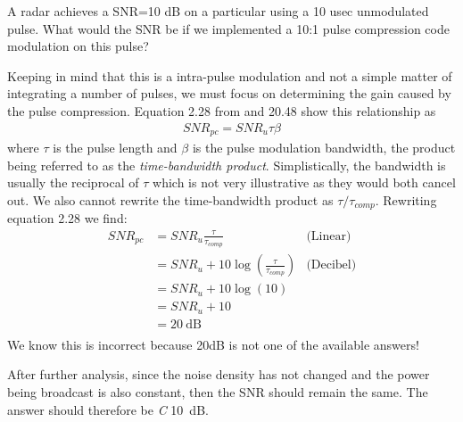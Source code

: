 \documentclass[12pt]{article}
\newcommand\SNR{\mathit{SNR}} %
\newenvironment{exercise}[2][Exercise]{\begin{trivlist}
    \item[\hskip \labelsep {\bfseries #1}\hskip \labelsep {\bfseries #2.}]}{\end{trivlist}}
\begin{document}
      \begin{exercise}{14}
      A radar achieves a SNR=10 dB on a particular using a 10 usec unmodulated pulse. What would the SNR be if we implemented a 10:1 pulse compression code modulation on this pulse?

      Keeping in mind that this is a intra-pulse modulation and not a simple matter of integrating a number of pulses, we must focus on determining the gain caused by the pulse compression. Equation 2.28 from \cite[p.~74]{POMR} and 20.48 \cite[p.~788]{POMR} show this relationship as
      \begin{align*}
      \SNR_{pc} = \SNR_{u} \tau \beta
      \end{align*}
      where $\tau$ is the pulse length and $\beta$ is the pulse modulation bandwidth, the product being referred to as the \emph{time-bandwidth product}. Simplistically, the bandwidth is usually the reciprocal of $\tau$ which is not very illustrative as they would both cancel out. We also cannot rewrite the time-bandwidth product as $\tau / \tau_{comp}$. Rewriting equation 2.28 we find:
      \begin{align*}
      \SNR_{pc} & = \SNR_{u} \frac{\tau}{\tau_{comp}}  & \text{(Linear)} \\
      &= \SNR_{u} + 10 \log { (\frac{\tau}{\tau_{comp}}) } & \text{(Decibel)}\\
      &= \SNR_{u} + 10 \log { (10) }\\
      &= \SNR_{u} + 10\\
      &= \SI{20}{\dB}\\
      \end{align*}  
      We know this is incorrect because 20dB is not one of the available answers!  
      
      After further analysis, since the noise density has not changed and the power being broadcast is also constant, then the SNR should remain the same.  The answer should therefore be \emph{C} \SI{10}{\dB}.
      
      
      

\end{exercise}
\end{document}
